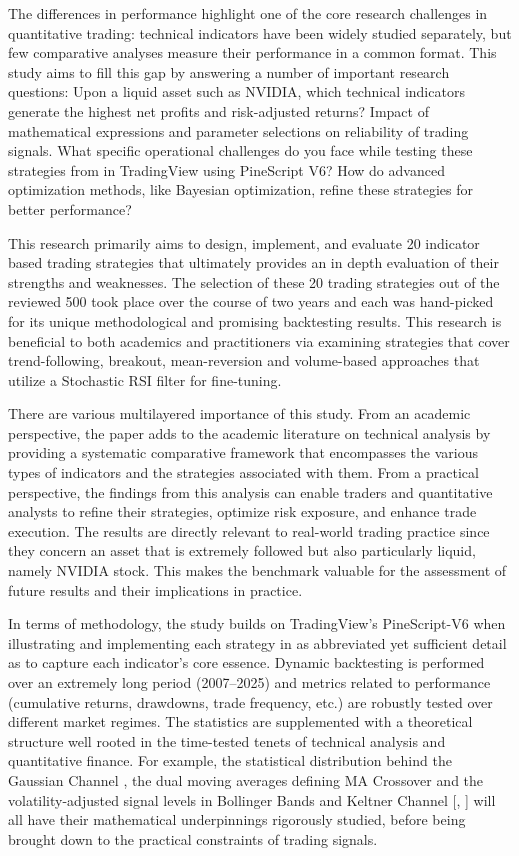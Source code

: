 The differences in performance highlight one of the core research challenges in quantitative trading: technical indicators have been widely studied separately, but few comparative analyses measure their performance in a common format. This study aims to fill this gap by answering a number of important research questions: Upon a liquid asset such as NVIDIA, which technical indicators generate the highest net profits and risk-adjusted returns? Impact of mathematical expressions and parameter selections on reliability of trading signals. What specific operational challenges do you face while testing these strategies from in TradingView using PineScript V6? How do advanced optimization methods, like Bayesian optimization, refine these strategies for better performance?

This research primarily aims to design, implement, and evaluate 20 indicator based trading strategies that ultimately provides an in depth evaluation of their strengths and weaknesses. The selection of these 20 trading strategies out of the reviewed 500 took place over the course of two years and each was hand-picked for its unique methodological and promising backtesting results. This research is beneficial to both academics and practitioners via examining strategies that cover trend-following, breakout, mean-reversion and volume-based approaches that utilize a Stochastic RSI filter for fine-tuning.

There are various multilayered importance of this study. From an academic perspective, the paper adds to the academic literature on technical analysis by providing a systematic comparative framework that encompasses the various types of indicators and the strategies associated with them. From a practical perspective, the findings from this analysis can enable traders and quantitative analysts to refine their strategies, optimize risk exposure, and enhance trade execution. The results are directly relevant to real-world trading practice since they concern an asset that is extremely followed but also particularly liquid, namely NVIDIA stock. This makes the benchmark valuable for the assessment of future results and their implications in practice.

In terms of methodology, the study builds on TradingView’s PineScript-V6 when illustrating and implementing each strategy in as abbreviated yet sufficient detail as to capture each indicator’s core essence. Dynamic backtesting is performed over an extremely long period (2007–2025) and metrics related to performance (cumulative returns, drawdowns, trade frequency, etc.) are robustly tested over different market regimes. The statistics are supplemented with a theoretical structure well rooted in the time-tested tenets of technical analysis and quantitative finance. For example, the statistical distribution behind the Gaussian Channel \cite{gaussian_channel_2022}, the dual moving averages defining MA Crossover \cite{macrossover_trend_2015} and the volatility-adjusted signal levels in Bollinger Bands and Keltner Channel [\cite{bollinger_bands_1991}, \cite{keltner_channel_2005}] will all have their mathematical underpinnings rigorously studied, before being brought down to the practical constraints of trading signals.

